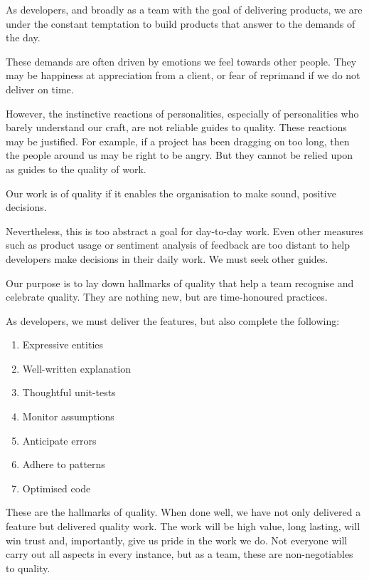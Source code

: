 \documentclass[10pt,openany,10pt]{book}
\providecommand{\tightlist}{%
  \setlength{\itemsep}{0pt}\setlength{\parskip}{0pt}}
\begin{document}
As developers, and broadly as a team with the goal of delivering
products, we are under the constant temptation to build products that
answer to the demands of the day.

These demands are often driven by emotions we feel towards other people.
They may be happiness at appreciation from a client, or fear of
reprimand if we do not deliver on time.

However, the instinctive reactions of personalities, especially of
personalities who barely understand our craft, are not reliable guides
to quality. These reactions may be justified. For example, if a project
has been dragging on too long, then the people around us may be right to
be angry. But they cannot be relied upon as guides to the quality of
work.

Our work is of quality if it enables the organisation to make sound,
positive decisions.

Nevertheless, this is too abstract a goal for day-to-day work. Even
other measures such as product usage or sentiment analysis of feedback
are too distant to help developers make decisions in their daily work.
We must seek other guides.

Our purpose is to lay down hallmarks of quality that help a team
recognise and celebrate quality. They are nothing new, but are
time-honoured practices.

As developers, we must deliver the features, but also complete the
following:

\begin{enumerate}
\def\labelenumi{\arabic{enumi}.}
\tightlist
\item
  Expressive entities
\item
  Well-written explanation
\item
  Thoughtful unit-tests
\item
  Monitor assumptions
\item
  Anticipate errors
\item
  Adhere to patterns
\item
  Optimised code
\end{enumerate}

These are the hallmarks of quality. When done well, we have not only
delivered a feature but delivered quality work. The work will be high
value, long lasting, will win trust and, importantly, give us pride in
the work we do. Not everyone will carry out all aspects in every
instance, but as a team, these are non-negotiables to quality.
\end{document}
